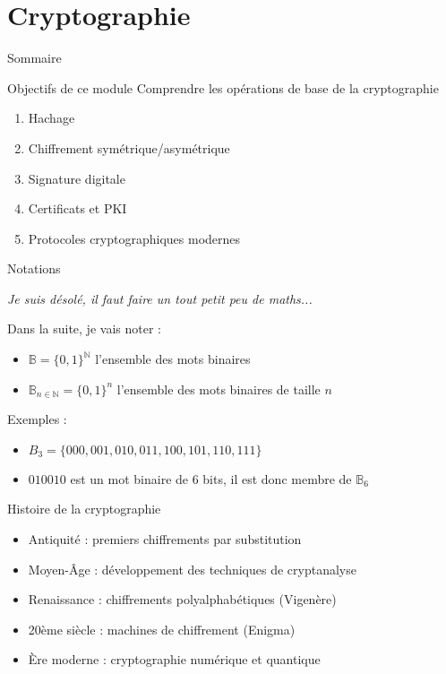 \section{Cryptographie}

\begin{frame}{Sommaire}
  \setcounter{tocdepth}{2}
\end{frame}

\begin{frame}{Objectifs de ce module}
  Comprendre les opérations de base de la cryptographie
  \begin{enumerate}
    \item Hachage
    \item Chiffrement symétrique/asymétrique
    \item Signature digitale
    \item Certificats et PKI
    \item Protocoles cryptographiques modernes
  \end{enumerate}
\end{frame}

\begin{frame}{Notations}
  \begin{tiny}
    \textit{Je suis désolé, il faut faire un tout petit peu de maths...}
  \end{tiny}

  Dans la suite, je vais noter :

  \begin{itemize}
    \item $\mathbb{B} = \{0,1\}^\mathbb{N}$ l'ensemble des mots binaires
    \item $\mathbb{B}_{n \in \mathbb{N}} = \{0,1\}^n$ l'ensemble des mots binaires de taille $n$
  \end{itemize}

  Exemples :

  \begin{itemize}
    \item $B_3 = \{000, 001, 010, 011, 100, 101, 110, 111\}$
    \item $010010$ est un mot binaire de 6 bits, il est donc membre de $\mathbb{B}_6$
  \end{itemize}
\end{frame}

\begin{frame}{Histoire de la cryptographie}
  \begin{itemize}
    \item Antiquité : premiers chiffrements par substitution
    \item Moyen-Âge : développement des techniques de cryptanalyse
    \item Renaissance : chiffrements polyalphabétiques (Vigenère)
    \item 20ème siècle : machines de chiffrement (Enigma)
    \item Ère moderne : cryptographie numérique et quantique
  \end{itemize}
\end{frame}

